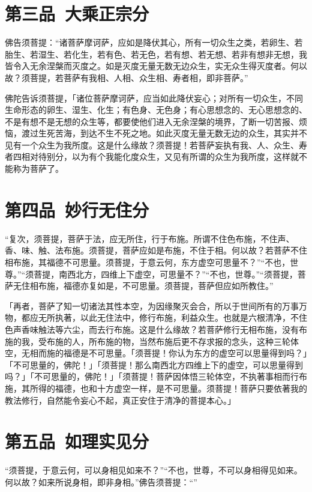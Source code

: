 \documentclass[12pt,twoside,openany]{book}
\newcommand{\kai}[1]{{\CJKfamily{kai}#1}}
\begin{document}
\chapter{第三品\ 大乘正宗分}

佛告须菩提：“诸菩萨摩诃萨，应如是降伏其心，所有一切众生之类，若卵生、若胎生、若湿生、若化生，若有色、若无色，若有想、若无想、若非有想非无想，我皆令入无余涅槃而灭度之。如是灭度无量无数无边众生，实无众生得灭度者。何以故？须菩提，若菩萨有我相、人相、众生相、寿者相，即非菩萨。”

\kai{佛陀告诉须菩提，「诸位菩萨摩诃萨，应当如此降伏妄心；对所有一切众生，不同生命形态的卵生、湿生、化生；有色身、无色身；有心思想念的、无心思想念的、不是有想不是无想的众生等，都要使他们进入无余涅槃的境界，了断一切苦报、烦恼，渡过生死苦海，到达不生不死之地。如此灭度无量无数无边的众生，其实并不见有一个众生为我所度。这是什么缘故？须菩提！若菩萨妄执有我、人、众生、寿者四相对待别分，以为有个我能化度众生，又见有所谓的众生为我所度，这样就不能称为菩萨了。}

\chapter{第四品\ 妙行无住分}

“复次，须菩提，菩萨于法，应无所住，行于布施。所谓不住色布施，不住声、香、味、触、法布施。须菩提，菩萨应如是布施，不住于相。何以故？若菩萨不住相布施，其福德不可思量。须菩提，于意云何，东方虚空可思量不？”“不也，世尊。”“须菩提，南西北方，四维上下虚空，可思量不？”“不也，世尊。”“须菩提，菩萨无住相布施，福德亦复如是，不可思量。须菩提，菩萨但应如所教住。”

\kai{「再者，菩萨了知一切诸法其性本空，为因缘聚灭会合，所以于世间所有的万事万物，都应无所执著，以此无住法中，修行布施，利益众生。也就是六根清净，不住色声香味触法等六尘，而去行布施。这是什么缘故？若菩萨修行无相布施，没有布施的我，受布施的人，所布施的物，当然布施后更不存求报的念头，这种三轮体空，无相而施的福德是不可思量。「须菩提！你认为东方的虚空可以思量得到吗？」「不可思量的，佛陀！」「须菩提！那么南西北方四维上下的虚空，可以思量得到吗？」「不可思量的，佛陀！」「须菩提！菩萨因体悟三轮体空，不执著事相而行布施，其所得的福德，也和十方虚空一样，是不可思量。须菩提！菩萨只要依著我的教法修行，自然能令妄心不起，真正安住于清净的菩提本心。」}

\chapter{第五品\ 如理实见分}

“须菩提，于意云何，可以身相见如来不？”“不也，世尊，不可以身相得见如来。何以故？如来所说身相，即非身相。”佛告须菩提：“{\color{red}{凡所有相，皆是虚妄。若见诸相非相，即见如来。}}”
\end{document}
